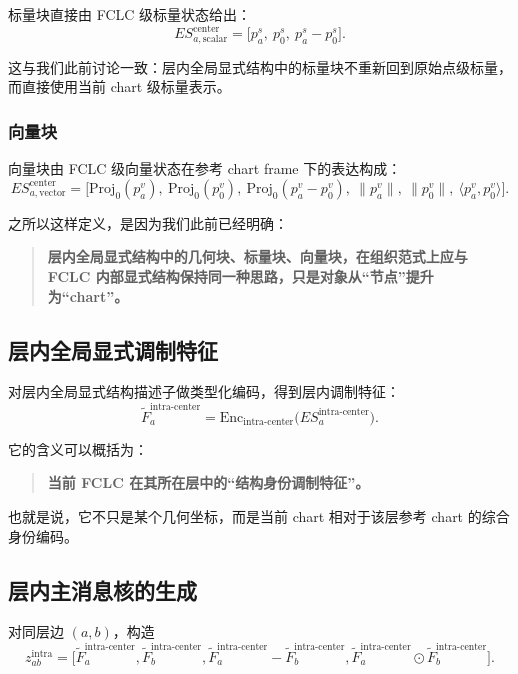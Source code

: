 \documentclass[12pt,a4paper]{ctexart}
\begin{document}
标量块直接由 FCLC 级标量状态给出：
\[
ES_{a,\mathrm{scalar}}^{\mathrm{center}}
=
\big[
p_a^s,\
p_0^s,\
p_a^s-p_0^s
\big].
\]

这与我们此前讨论一致：层内全局显式结构中的标量块不重新回到原始点级标量，而直接使用当前 chart 级标量表示。

\subsubsection{向量块}

向量块由 FCLC 级向量状态在参考 chart frame 下的表达构成：
\[
ES_{a,\mathrm{vector}}^{\mathrm{center}}
=
\big[
\mathrm{Proj}_{0}(p_a^v),\
\mathrm{Proj}_{0}(p_0^v),\
\mathrm{Proj}_{0}(p_a^v-p_0^v),\
\|p_a^v\|,\
\|p_0^v\|,\
\langle p_a^v,p_0^v\rangle
\big].
\]

之所以这样定义，是因为我们此前已经明确：

\begin{quote}
\textbf{层内全局显式结构中的几何块、标量块、向量块，在组织范式上应与 FCLC 内部显式结构保持同一种思路，只是对象从“节点”提升为“chart”。}
\end{quote}

\subsection{层内全局显式调制特征}

对层内全局显式结构描述子做类型化编码，得到层内调制特征：
\[
\tilde F_a^{\mathrm{intra\text{-}center}}
=
\mathrm{Enc}_{\mathrm{intra\text{-}center}}
\big(
ES_a^{\mathrm{intra\text{-}center}}
\big).
\]

它的含义可以概括为：

\begin{quote}
\textbf{当前 FCLC 在其所在层中的“结构身份调制特征”。}
\end{quote}

也就是说，它不只是某个几何坐标，而是当前 chart 相对于该层参考 chart 的综合身份编码。

\subsection{层内主消息核的生成}

对同层边 \((a,b)\)，构造
\[
z_{ab}^{\mathrm{intra}}
=
\Big[
\tilde F_a^{\mathrm{intra\text{-}center}},
\tilde F_b^{\mathrm{intra\text{-}center}},
\tilde F_a^{\mathrm{intra\text{-}center}}-\tilde F_b^{\mathrm{intra\text{-}center}},
\tilde F_a^{\mathrm{intra\text{-}center}}\odot \tilde F_b^{\mathrm{intra\text{-}center}}
\Big].
\]
\end{document}
